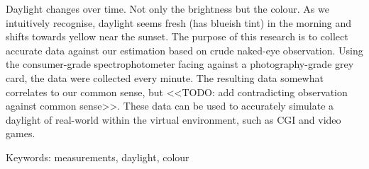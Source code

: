 Daylight changes over time. Not only the brightness but the colour. As we intuitively recognise, daylight seems fresh (has blueish tint) in the morning and shifts towards yellow near the sunset. The purpose of this research is to collect accurate data against our estimation based on crude naked-eye observation. Using the consumer-grade spectrophotometer facing against a photography-grade grey card, the data were collected every minute. The resulting data somewhat correlates to our common sense, but <<TODO: add contradicting observation against common sense>>. These data can be used to accurately simulate a daylight of real-world within the virtual environment, such as CGI and video games.

Keywords: measurements, daylight, colour

